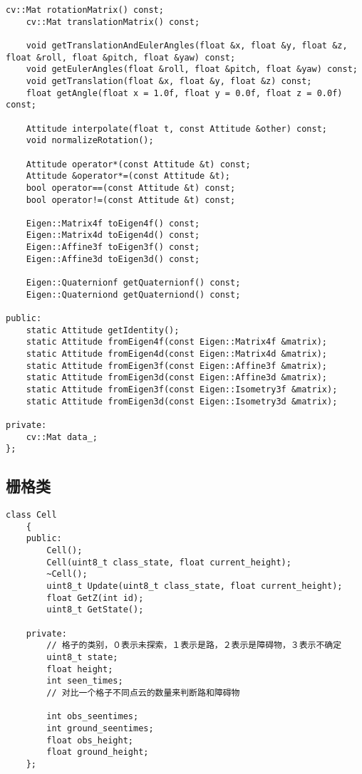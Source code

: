 \documentclass[UTF8]{ctexart}
\begin{document}
\begin{lstlisting}[caption={}]
    cv::Mat rotationMatrix() const;
    cv::Mat translationMatrix() const;

    void getTranslationAndEulerAngles(float &x, float &y, float &z, float &roll, float &pitch, float &yaw) const;
    void getEulerAngles(float &roll, float &pitch, float &yaw) const;
    void getTranslation(float &x, float &y, float &z) const;
    float getAngle(float x = 1.0f, float y = 0.0f, float z = 0.0f) const;

    Attitude interpolate(float t, const Attitude &other) const;
    void normalizeRotation();

    Attitude operator*(const Attitude &t) const;
    Attitude &operator*=(const Attitude &t);
    bool operator==(const Attitude &t) const;
    bool operator!=(const Attitude &t) const;

    Eigen::Matrix4f toEigen4f() const;
    Eigen::Matrix4d toEigen4d() const;
    Eigen::Affine3f toEigen3f() const;
    Eigen::Affine3d toEigen3d() const;

    Eigen::Quaternionf getQuaternionf() const;
    Eigen::Quaterniond getQuaterniond() const;

public:
    static Attitude getIdentity();
    static Attitude fromEigen4f(const Eigen::Matrix4f &matrix);
    static Attitude fromEigen4d(const Eigen::Matrix4d &matrix);
    static Attitude fromEigen3f(const Eigen::Affine3f &matrix);
    static Attitude fromEigen3d(const Eigen::Affine3d &matrix);
    static Attitude fromEigen3f(const Eigen::Isometry3f &matrix);
    static Attitude fromEigen3d(const Eigen::Isometry3d &matrix);

private:
    cv::Mat data_;
};
\end{lstlisting}

\subsection{栅格类}

\begin{lstlisting}[caption={}]
    class Cell
    {
    public:
        Cell();
        Cell(uint8_t class_state, float current_height);
        ~Cell();
        uint8_t Update(uint8_t class_state, float current_height);
        float GetZ(int id);
        uint8_t GetState();
    
    private:
        // 格子的类别，０表示未探索，１表示是路，２表示是障碍物，３表示不确定
        uint8_t state;
        float height;
        int seen_times;
        // 对比一个格子不同点云的数量来判断路和障碍物
    
        int obs_seentimes;
        int ground_seentimes;
        float obs_height;
        float ground_height;
    };
\end{lstlisting}
\end{document}

